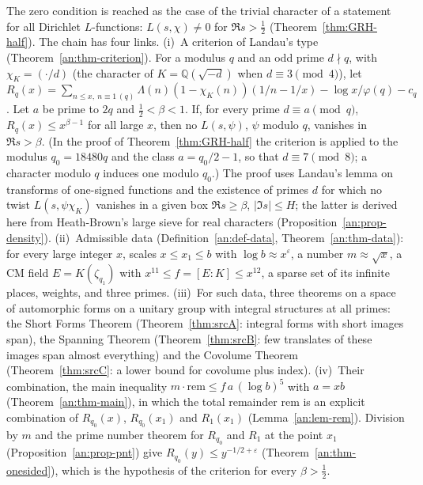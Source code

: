 \documentclass[10pt]{amsart}
\theoremstyle{definition}
\theoremstyle{remark}
\newcommand{\anThmA}{\ref{thm:srcA}}\newcommand{\anThmB}{\ref{thm:srcB}}\newcommand{\anThmC}{\ref{thm:srcC}}
\begin{document}
The zero condition is reached as the case of the trivial character of a
statement for all Dirichlet $L$-functions: $L(s,\chi)\ne0$ for
$\Re s>\frac12$ (Theorem~\ref{thm:GRH-half}). The chain has four links.
(i)~A criterion of Landau's type (Theorem~\ref{an:thm-criterion}). For a
modulus $q$ and an odd prime $d\nmid q$, with $\chi_K=(\cdot/d)$ (the
character of $K=\mathbb Q(\sqrt{-d})$ when $d\equiv3\pmod4$), let
$R_q(x)=\sum_{n\le x,\ n\equiv1\,(q)}\Lambda(n)(1-\chi_K(n))(1/n-1/x)-\log x/\varphi(q)-c_q$.
Let $a$ be prime to $2q$ and $\frac12<\beta<1$. If, for every prime
$d\equiv a\pmod q$, $R_q(x)\le x^{\beta-1}$ for all large $x$, then no
$L(s,\psi)$, $\psi$ modulo $q$, vanishes in $\Re s>\beta$. (In the proof
of Theorem~\ref{thm:GRH-half} the criterion is applied to the modulus
$q_0=18480q$ and the class $a=q_0/2-1$, so that $d\equiv7\pmod8$; a
character modulo $q$ induces one modulo $q_0$.) The
proof uses Landau's lemma on transforms of one-signed functions and the
existence of primes $d$ for which no twist $L(s,\psi\chi_K)$ vanishes in a
given box $\Re s\ge\beta$, $|\Im s|\le H$; the latter is derived here from
Heath-Brown's large sieve for real characters
(Proposition~\ref{an:prop-density}).
(ii)~Admissible data (Definition~\ref{an:def-data},
Theorem~\ref{an:thm-data}): for every large integer $x$, scales
$x\le x_1\le b$ with $\log b\approx x^{\varepsilon}$, a number
$m\approx\sqrt x$, a CM field $E=K(\zeta_{q_1})$ with
$x^{11}\le f=[E:K]\le x^{12}$,
a sparse set of its infinite places, weights, and three primes.
(iii)~For such data, three theorems on a space of automorphic forms on a
unitary group with integral structures at all primes: the Short Forms Theorem
(Theorem~\anThmA: integral forms with short images span), the Spanning Theorem
(Theorem~\anThmB: few translates of these images span almost everything) and the
Covolume Theorem (Theorem~\anThmC: a lower bound for covolume plus index).
(iv)~Their combination, the main inequality
$m\cdot\mathrm{rem}\le f\,a\,(\log b)^5$ with $a=xb$
(Theorem~\ref{an:thm-main}), in which
the total remainder $\mathrm{rem}$ is an explicit combination of $R_{q_0}(x)$,
$R_{q_0}(x_1)$ and $R_1(x_1)$ (Lemma~\ref{an:lem-rem}). Division by $m$ and the
prime number theorem for $R_{q_0}$ and $R_1$ at the point $x_1$
(Proposition~\ref{an:prop-pnt}) give
$R_{q_0}(y)\le y^{-1/2+\varepsilon}$ (Theorem~\ref{an:thm-onesided}), which is
the hypothesis of the criterion for every $\beta>\frac12$.
\end{document}
